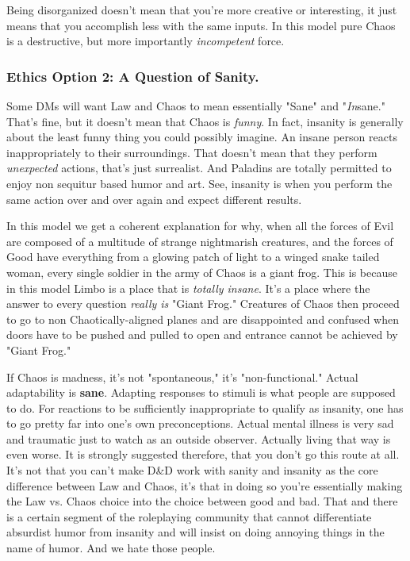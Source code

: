 Being disorganized doesn't mean that you're more creative or interesting, it just means that you accomplish less with the same inputs. In this model pure Chaos is a destructive, but more importantly \textit{incompetent} force.

\subsubsection{Ethics Option 2: A Question of Sanity.}
Some DMs will want Law and Chaos to mean essentially "Sane" and "\textit{In}sane." That's fine, but it doesn't mean that Chaos is \textit{funny}. In fact, insanity is generally about the least funny thing you could possibly imagine. An insane person reacts inappropriately to their surroundings. That doesn't mean that they perform \textit{unexpected} actions, that's just surrealist. And Paladins are totally permitted to enjoy non sequitur based humor and art. See, insanity is when you perform the same action over and over again and expect different results.

In this model we get a coherent explanation for why, when all the forces of Evil are composed of a multitude of strange nightmarish creatures, and the forces of Good have everything from a glowing patch of light to a winged snake tailed woman, every single soldier in the army of Chaos is a giant frog. This is because in this model Limbo is a place that is \textit{totally insane}. It's a place where the answer to every question \textit{really is} "Giant Frog." Creatures of Chaos then proceed to go to non Chaotically-aligned planes and are disappointed and confused when doors have to be pushed and pulled to open and entrance cannot be achieved by "Giant Frog."

If Chaos is madness, it's not "spontaneous," it's "non-functional." Actual adaptability is \textbf{sane}. Adapting responses to stimuli is what people are supposed to do. For reactions to be sufficiently inappropriate to qualify as insanity, one has to go pretty far into one's own preconceptions. Actual mental illness is very sad and traumatic just to watch as an outside observer. Actually living that way is even worse. It is strongly suggested therefore, that you don't go this route at all. It's not that you can't make D\&D work with sanity and insanity as the core difference between Law and Chaos, it's that in doing so you're essentially making the Law vs. Chaos choice into the choice between good and bad. That and there is a certain segment of the roleplaying community that cannot differentiate absurdist humor from insanity and will insist on doing annoying things in the name of humor. And we hate those people.


